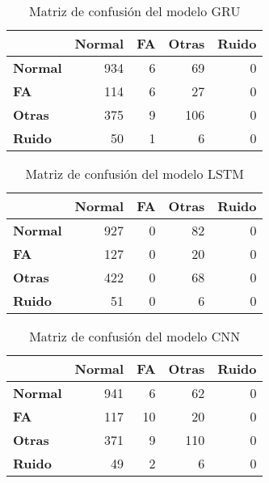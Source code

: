         
        
        \begin{table}[htbp]
        \caption{Matriz de confusión del modelo GRU}
        \begin{center}
        \begin{tabular}{|l|r|r|r|r|}
        \hline
        \textbf{} & \multicolumn{1}{l|}{\textbf{Normal}} & \multicolumn{1}{l|}{\textbf{FA}} & \multicolumn{1}{l|}{\textbf{Otras}} & \multicolumn{1}{l|}{\textbf{Ruido}} \\ \hline
        \textbf{Normal} & 934 & 6 & 69 & 0 \\ \hline
        \textbf{FA} & 114 & 6 & 27 & 0 \\ \hline
        \textbf{Otras} & 375 & 9 & 106 & 0 \\ \hline
        \textbf{Ruido} & 50 & 1 & 6 & 0 \\ \hline
        \end{tabular}
        \end{center}
        \label{table:CM gru}
        \end{table}

        
      \begin{table}[htbp]
        \caption{Matriz de confusión del modelo LSTM}
        \begin{center}
        \begin{tabular}{|l|r|r|r|r|}
        \hline
        \textbf{} & \multicolumn{1}{l|}{\textbf{Normal}} & \multicolumn{1}{l|}{\textbf{FA}} & \multicolumn{1}{l|}{\textbf{Otras}} & \multicolumn{1}{l|}{\textbf{Ruido}} \\ \hline
        \textbf{Normal} & 927 & 0 & 82 & 0 \\ \hline
        \textbf{FA} & 127 & 0 & 20 & 0 \\ \hline
        \textbf{Otras} & 422 & 0 & 68 & 0 \\ \hline
        \textbf{Ruido} & 51 & 0 & 6 & 0 \\ \hline
        \end{tabular}
        \end{center}
        \label{table:CM lstm}
        \end{table}
  
        \begin{table}[htbp]
        \caption{Matriz de confusión del modelo CNN}
        \begin{center}
        \begin{tabular}{|l|r|r|r|r|}
        \hline
         & \multicolumn{1}{l|}{\textbf{Normal}} & \multicolumn{1}{l|}{\textbf{FA}} & \multicolumn{1}{l|}{\textbf{Otras}} & \multicolumn{1}{l|}{\textbf{Ruido}} \\ \hline
        \textbf{Normal} & 941 & 6 & 62 & 0 \\ \hline
        \textbf{FA} & 117 & 10 & 20 & 0 \\ \hline
        \textbf{Otras} & 371 & 9 & 110 & 0 \\ \hline
        \textbf{Ruido} & 49 & 2 & 6 & 0 \\ \hline
        \end{tabular}
        \end{center}
        \label{table:CM cnn}
        \end{table}


